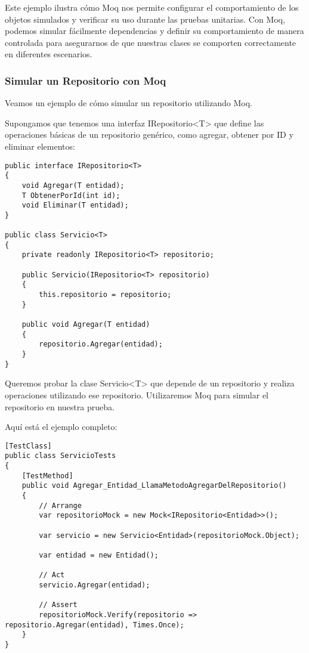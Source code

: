 \documentclass[executivepaper]{article}
\begin{document}
Este ejemplo ilustra cómo Moq nos permite configurar el comportamiento de los objetos simulados y verificar su uso durante las pruebas unitarias. Con Moq, podemos simular fácilmente dependencias y definir su comportamiento de manera controlada para asegurarnos de que nuestras clases se comporten correctamente en diferentes escenarios.

\subsubsection*{Simular un Repositorio con Moq}

Veamos un ejemplo de cómo simular un repositorio utilizando Moq.

Supongamos que tenemos una interfaz IRepositorio<T> que define las operaciones básicas de un repositorio genérico, como agregar, obtener por ID y eliminar elementos:

\begin{lstlisting}
public interface IRepositorio<T>
{
    void Agregar(T entidad);
    T ObtenerPorId(int id);
    void Eliminar(T entidad);
}    

public class Servicio<T>
{
    private readonly IRepositorio<T> repositorio;

    public Servicio(IRepositorio<T> repositorio)
    {
        this.repositorio = repositorio;
    }

    public void Agregar(T entidad)
    {
        repositorio.Agregar(entidad);
    }
}

\end{lstlisting}

Queremos probar la clase Servicio<T> que depende de un repositorio y realiza operaciones utilizando ese repositorio. Utilizaremos Moq para simular el repositorio en nuestra prueba.

Aquí está el ejemplo completo:

\begin{lstlisting}
[TestClass]
public class ServicioTests
{
    [TestMethod]
    public void Agregar_Entidad_LlamaMetodoAgregarDelRepositorio()
    {
        // Arrange
        var repositorioMock = new Mock<IRepositorio<Entidad>>();

        var servicio = new Servicio<Entidad>(repositorioMock.Object);

        var entidad = new Entidad();

        // Act
        servicio.Agregar(entidad);

        // Assert
        repositorioMock.Verify(repositorio => repositorio.Agregar(entidad), Times.Once);
    }
}
\end{lstlisting}
\end{document}
